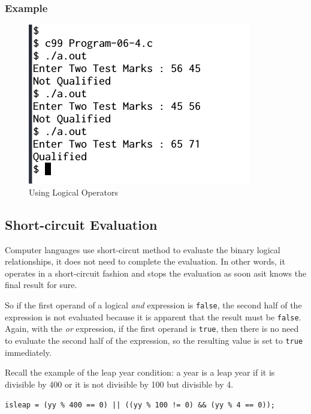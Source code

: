 \documentclass[11pt,a4paper]{article}
\begin{document}
\subsubsection*{Example}


\begin{figure}[ht]
\begin{center}
\includegraphics[scale=0.6]{Output-06-4.png}
\caption{Using Logical Operators}
\label{output-06-4}\end{center}
\end{figure}

\subsection*{Short-circuit Evaluation}
Computer languages use short-circut method to evaluate the binary logical relationships, it does not need to complete the evaluation. In other words, it operates in a short-circuit fashion and stops the evaluation as soon asit knows the final result for sure.

So if the first operand of a logical \emph{and} expression is \texttt{false}, the second half of the expression is not evaluated because it is apparent that the result must be \texttt{false}. Again, with the \emph{or} expression, if the first operand is \texttt{true}, then there is no need to evaluate the second half of the expression, so the resulting value is set to \texttt{true} immediately.

Recall the example of the leap year condition: a year is a leap year if it is divisible by 400 or it is not divisible by 100 but divisible by 4.

\texttt{isleap = (yy \% 400 == 0) || ((yy \% 100 != 0) \&\& (yy \% 4 == 0));}
\end{document}
